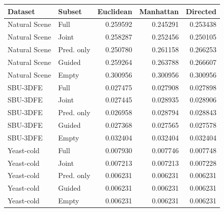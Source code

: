 \begin{center}
\begin{tabular}{llrrr}
\hline
Dataset & Subset & Euclidean & Manhattan & Directed\\
\hline
Natural Scene & Full & 0.259592 & 0.245291 & 0.253438\\
Natural Scene & Joint & 0.258287 & 0.252456 & 0.250105\\
Natural Scene & Pred. only & 0.250780 & 0.261158 & 0.266253\\
Natural Scene & Guided & 0.259264 & 0.263788 & 0.266607\\
Natural Scene & Empty & 0.300956 & 0.300956 & 0.300956\\
SBU-3DFE & Full & 0.027475 & 0.027908 & 0.027898\\
SBU-3DFE & Joint & 0.027445 & 0.028935 & 0.028906\\
SBU-3DFE & Pred. only & 0.026958 & 0.028794 & 0.028843\\
SBU-3DFE & Guided & 0.027368 & 0.027565 & 0.027578\\
SBU-3DFE & Empty & 0.032404 & 0.032404 & 0.032404\\
Yeast-cold & Full & 0.007930 & 0.007746 & 0.007748\\
Yeast-cold & Joint & 0.007213 & 0.007213 & 0.007228\\
Yeast-cold & Pred. only & 0.006231 & 0.006231 & 0.006231\\
Yeast-cold & Guided & 0.006231 & 0.006231 & 0.006231\\
Yeast-cold & Empty & 0.006231 & 0.006231 & 0.006231\\
\hline
\end{tabular}
\end{center}